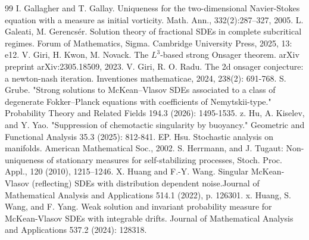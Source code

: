\documentclass[UTF-8,reqno]{amsart}
\numberwithin{equation}{section}
\theoremstyle{definition}
\begin{document}
\begin{thebibliography}{99}
 I. Gallagher and T. Gallay. Uniqueness for the two-dimensional Navier-Stokes equation with
a measure as initial vorticity. Math. Ann., 332(2):287–327, 2005.
L. Galeati, M. Gerencs\'er. Solution theory of fractional SDEs in complete subcritical regimes. Forum of Mathematics, Sigma. Cambridge University Press, 2025, 13: e12.
V. Giri, H.  Kwon, M. Novack. The $ L^ 3$-based strong Onsager theorem. arXiv preprint arXiv:2305.18509, 2023.
V. Giri, R. O. Radu. The 2d onsager conjecture: a newton-nash iteration. Inventiones mathematicae, 2024, 238(2): 691-768.
S. Grube. "Strong solutions to McKean–Vlasov SDEs associated to a class of degenerate Fokker–Planck equations with coefficients of Nemytskii-type." Probability Theory and Related Fields 194.3 (2026): 1495-1535.
z. Hu, A.  Kiselev, and Y. Yao. "Suppression of chemotactic singularity by buoyancy." Geometric and Functional Analysis 35.3 (2025): 812-841.
EP. Hsu. Stochastic analysis on manifolds. American Mathematical Soc., 2002.
S. Herrmann, and J. Tugaut: Non-uniqueness of stationary measures for self-stabilizing
processes, Stoch. Proc. Appl., 120 (2010), 1215–1246.
X. Huang and F.-Y. Wang. Singular McKean-Vlasov (reflecting) SDEs with
distribution dependent noise.Journal of Mathematical Analysis and Applications
514.1 (2022), p. 126301.
x. Huang, S. Wang, and F. Yang. Weak solution and invariant probability measure for McKean-Vlasov SDEs with integrable drifts. Journal of Mathematical Analysis and Applications 537.2 (2024): 128318.


\end{thebibliography}
\end{document}
